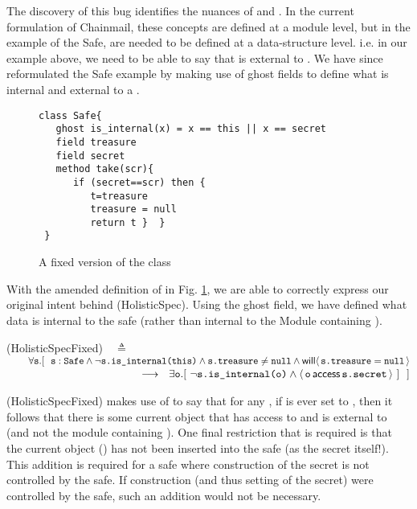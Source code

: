 The discovery of this bug identifies the nuances of  and . In the current formulation of 
Chainmail, these concepts are defined at a module level, but in the example of the Safe, are needed to be defined 
at a data-structure level. i.e. in our example above, we need to be able to say that  is external to .
We have since reformulated the Safe example by making use of ghost fields to define what is internal and external 
to a .

 \begin{figure}[htb]
\begin{lstlisting}
class Safe{
   ghost is_internal(x) = x == this || x == secret
   field treasure 
   field secret 
   method take(scr){
      if (secret==scr) then {
         t=treasure
         treasure = null
         return t }  }
 }
\end{lstlisting}
  \vspace*{-0.95cm}
  \caption{A fixed version of the class }
 \label{fig:ExampleSafeFix}
 \vspace*{-0.65cm}
 \end{figure}
 
 With the amended definition of  in Fig. \ref{fig:ExampleSafeFix}, we are able to correctly express our original intent behind (HolisticSpec).
 Using the  ghost field, we have defined what data is internal to the safe (rather than internal to the Module containing ).
 
\vspace{.1in}
(HolisticSpecFixed)\ \  $\triangleq$\\ 
$\strut \hspace{.3in}   \forall \prg{s}. %
[\ \ \prg{s}:\prg{Safe} \wedge \neg \prg{s.is\_internal(this)} \wedge \prg{s.treasure}\neq\prg{null}   \wedge   \Future{\prg{s.treasure}=\prg{null}} $ \\ 
 $ \strut \hspace{4.3cm}     \longrightarrow \ \  \exists \prg{o}. [\ \neg \prg{s.is\_internal(o)}  \wedge  \CanAccess{\prg{o}}{\prg{s.secret}}\ ]  \  \ ] \hfill $
\vspace{.1in}

 (HolisticSpecFixed) makes use of  to say that for any  , if  is ever set to , then it follows that
 there is some current object  that has access to  and is external to  (and not the module containing ). One final restriction that is required is that 
 the current object () has not been inserted into the safe (as the secret itself!). This addition is required for a safe where construction of the 
 secret is not controlled by the safe. If construction (and thus setting of the secret) were controlled by the safe, such an addition would not be necessary.